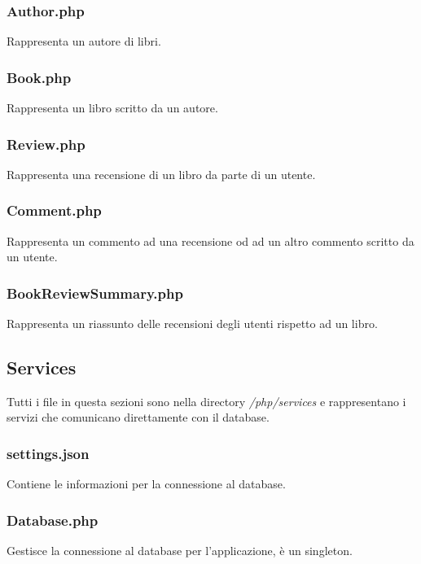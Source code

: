\documentclass[italian]{article}
\begin{document}
\subsubsection{Author.php}
Rappresenta un autore di libri.


\subsubsection{Book.php}
Rappresenta un libro scritto da un autore.


\subsubsection{Review.php}
Rappresenta una recensione di un libro da parte di un utente.


\subsubsection{Comment.php}
Rappresenta un commento ad una recensione od ad un altro commento scritto da un utente.


\subsubsection{BookReviewSummary.php}
Rappresenta un riassunto delle recensioni degli utenti rispetto ad un libro.


\subsection{Services}
Tutti i file in questa sezioni sono nella directory \textit{/php/services} e rappresentano i servizi che comunicano direttamente con il database.

\subsubsection{settings.json}
Contiene le informazioni per la connessione al database.


\subsubsection{Database.php}
Gestisce la connessione al database per l'applicazione, è un singleton.

\end{document}

